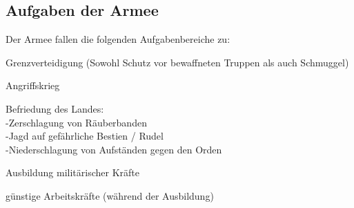 \subsection{Aufgaben der Armee}
Der Armee fallen die folgenden Aufgabenbereiche zu:
\begin{outline}
	\item Grenzverteidigung (Sowohl Schutz vor bewaffneten Truppen als auch Schmuggel)
	\item Angriffskrieg 
	\item Befriedung des Landes:\\
	-Zerschlagung von Räuberbanden \\
	-Jagd auf gefährliche Bestien / Rudel\\
	-Niederschlagung von Aufständen gegen den Orden
	\item Ausbildung militärischer Kräfte
	\item günstige Arbeitskräfte (während der Ausbildung)
\end{outline}

